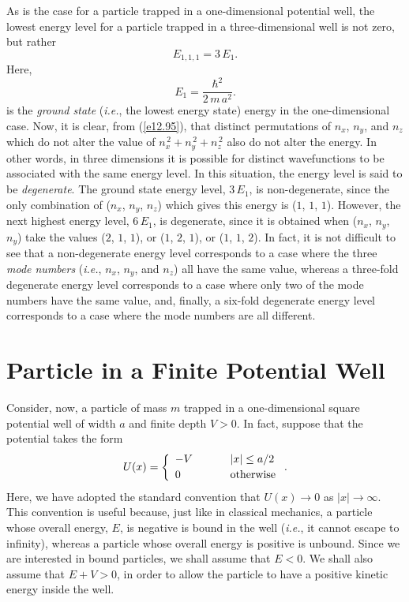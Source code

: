 As is the case for a particle trapped in a one-dimensional  potential well, the lowest
energy level for a particle trapped in a three-dimensional  well is not zero, but rather
\begin{equation}
E_{1,1,1} = 3\,E_1.
\end{equation}
Here, 
\begin{equation}
E_1 =  \frac{\hbar^2}{2\,m\,a^2}.
\end{equation}
is the {\em ground state}\/ ({\em i.e.}, the lowest energy state) energy in the one-dimension\-al
case.  
Now, it is clear, from (\ref{e12.95}), that distinct permutations of $n_x$, $n_y$, and $n_z$ which do
not alter the value of $n_x^{\,2}+n_y^{\,2}+ n_z^{\,2}$ also do not alter the energy. In other words, in three dimensions
it is possible for distinct wavefunctions to be associated with the same energy level. In this
situation, the energy level is said to be {\em degenerate}. The ground state energy level, $3\,E_1$, is non-degenerate,
since the only combination of ($n_x$, $n_y$,  $n_z$) which gives this energy is ($1$, $1$, $1$). 
However, the next highest energy level, $6\,E_1$, is degenerate, since it is obtained when ($n_x$, $n_y$,  $n_y$) 
take the values ($2$, $1$, $1$),
or ($1$, $2$, $1$), or ($1$, $1$, $2$). In fact, it is not difficult to see that a non-degenerate energy
level corresponds to a case where the three {\em mode numbers}\/ ({\em i.e.}, $n_x$, $n_y$, and $n_z$) all have
the same value, whereas a three-fold degenerate energy level corresponds to a case where only
two of the mode numbers have the same value, and, finally,  a six-fold degenerate energy level corresponds to a
case where the mode numbers are all different. 

\section{Particle in a Finite Potential Well}
Consider, now, a particle of mass $m$ trapped in a one-dimensional  square potential
well of width $a$ and finite depth $V>0$. In fact, suppose that the potential takes the form
\begin{equation}
U(x) = \left\{
\begin{array}{lll}
-V &\mbox{\hspace{0.5cm}}&|x|\leq a/2\\[0.5ex]
0&&\mbox{otherwise}
\end{array}
\right..\label{e12.100}
\end{equation}
Here, we have adopted the standard convention that $U(x)\rightarrow 0$ as $|x|\rightarrow \infty$. 
This convention is useful because, just like in classical mechanics, a particle whose overall energy, $E$,
is negative is bound in the well ({\em i.e.}, it cannot escape to infinity), whereas a
particle whose overall energy is positive is unbound. Since we are interested in bound particles,
we shall assume that $E<0$. We shall also assume that $E+V>0$,  in order to allow the particle
to have a positive kinetic energy inside the well. 

